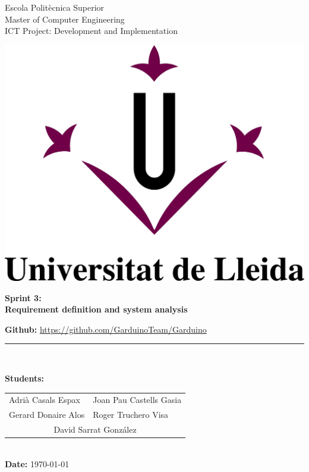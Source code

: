 \documentclass[11pt,a4paper]{article}
\begin{document}
\begin{titlepage}

\begin{flushleft}
Escola Politècnica Superior\\
\vspace*{0.15in}
Master of Computer Engineering\\
\vspace*{0.15in}
ICT Project: Development and Implementation
\end{flushleft}

\begin{center}
\vspace{2.0cm}\includegraphics[scale=0.3]{M-UdL.jpg}
\vspace{4.0cm}

\begin{LARGE}
\textbf{Sprint 3:}\\ 
\vspace*{0.15in}
\textbf{Requirement definition and system analysis}
\end{LARGE}
\vspace{5.0cm}

\vspace*{0.25in}
\textbf{Github: } \url{https://github.com/GarduinoTeam/Garduino}
\rule{80mm}{0.1mm}\\
\vspace*{0.1in}

\begin{large}
\textbf{Students:}

\begin{tabular}{ll}
Adrià Casals Espax  & Joan Pau Castells Gasia \\
Gerard Donaire Alos  & Roger Truchero Visa \\
\multicolumn{2}{c}{David Sarrat González}
\end{tabular}
\\
\vspace*{0.25in}
\textbf{Date:} \today \\
\end{large}

\end{center}
\end{titlepage}
 
\end{document}
